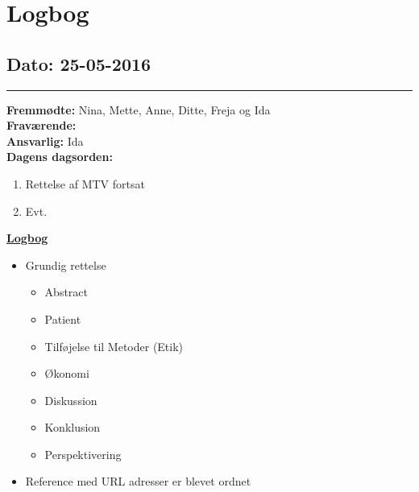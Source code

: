 \chapter{Logbog}
\section{Dato: 25-05-2016}
\hrule
\textbf{Fremmødte:} Nina, Mette, Anne, Ditte, Freja og Ida  \\
\textbf{Fraværende: } \\
\textbf{Ansvarlig:} Ida  \\
\textbf{Dagens dagsorden: }
\begin{enumerate}
\item Rettelse af MTV fortsat
\item Evt.
\end{enumerate}

\underline{\textbf{Logbog}}
\begin{itemize}
\item Grundig rettelse
\begin{itemize}
\item Abstract
\item Patient
\item Tilføjelse til Metoder (Etik)
\item Økonomi
\item Diskussion
\item Konklusion
\item Perspektivering
\end{itemize}
\item Reference med URL adresser er blevet ordnet
\end{itemize}
\newpage